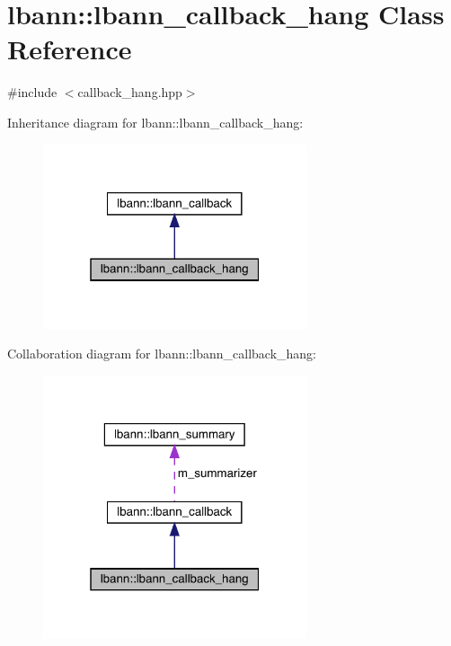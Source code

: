 \hypertarget{classlbann_1_1lbann__callback__hang}{}\section{lbann\+:\+:lbann\+\_\+callback\+\_\+hang Class Reference}
\label{classlbann_1_1lbann__callback__hang}


{\ttfamily \#include $<$callback\+\_\+hang.\+hpp$>$}



Inheritance diagram for lbann\+:\+:lbann\+\_\+callback\+\_\+hang\+:\nopagebreak
\begin{figure}[H]
\begin{center}
\leavevmode
\includegraphics[width=220pt]{classlbann_1_1lbann__callback__hang__inherit__graph}
\end{center}
\end{figure}


Collaboration diagram for lbann\+:\+:lbann\+\_\+callback\+\_\+hang\+:\nopagebreak
\begin{figure}[H]
\begin{center}
\leavevmode
\includegraphics[width=220pt]{classlbann_1_1lbann__callback__hang__coll__graph}
\end{center}
\end{figure}
